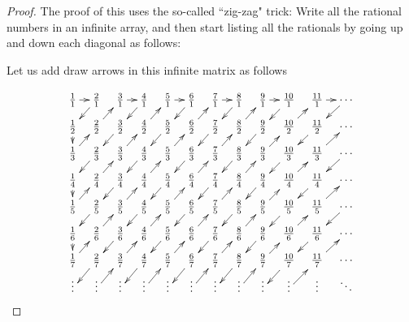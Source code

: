 \documentclass[a4paper,12pt,dvipsnames]{book}
\numberwithin{theorem}{chapter}
\theoremstyle{remark}
\begin{document}
\begin{proof}
The proof of this uses the so-called ``zig-zag" trick: Write all the rational numbers in an infinite array, and then start listing all the rationals by going up and down each diagonal as follows:


 Let us add draw arrows in this infinite matrix as
follows

$$\xymatrixrowsep{0.2cm}
\xymatrixcolsep{0.3cm}\xymatrix{
&\frac{1}{1}\ar@{->}[r] &\frac{2}{1}\ar@{->}[dl]&\frac{3}{1}\ar@{->}[r] &\frac{4}{1}\ar@{->}[dl]&\frac{5}{1}\ar@{->}[r] & \frac{6}{1}\ar@{->}[dl]& \frac{7}{1}\ar@{->}[r] & \frac{8}{1}\ar@{->}[dl]& \frac{9}{1}\ar@{->}[r] & \frac{10}{1}\ar@{->}[dl]& \frac{11}{1}\ar@{->}[r] &\cdots\ar@{->}[dl]&\\
&\frac{1}{2}\ar@{->}[d] &\frac{2}{2}\ar@{->}[ur]&\frac{3}{2}\ar@{->}[dl]&\frac{4}{2}\ar@{->}[ur]&\frac{5}{2}\ar@{->}[dl]& \frac{6}{2}\ar@{->}[ur]& \frac{7}{2}\ar@{->}[dl]& \frac{8}{2}\ar@{->}[ur]& \frac{9}{2}\ar@{->}[dl]& \frac{10}{2}\ar@{->}[ur]& \frac{11}{2}\ar@{->}[dl]&\cdots &\\
&\frac{1}{3}\ar@{->}[ur]&\frac{2}{3}\ar@{->}[dl]&\frac{3}{3}\ar@{->}[ur]&\frac{4}{3}\ar@{->}[dl]&\frac{5}{3}\ar@{->}[ur]& \frac{6}{3}\ar@{->}[dl]& \frac{7}{3}\ar@{->}[ur]& \frac{8}{3}\ar@{->}[dl]& \frac{9}{3}\ar@{->}[ur]& \frac{10}{3}\ar@{->}[dl]& \frac{11}{3}\ar@{->}[ur]&\cdots\ar@{->}[dl] &\\
&\frac{1}{4}\ar@{->}[d] &\frac{2}{4}\ar@{->}[ur]&\frac{3}{4}\ar@{->}[dl]&\frac{4}{4}\ar@{->}[ur]&\frac{5}{4}\ar@{->}[dl]& \frac{6}{4}\ar@{->}[ur]& \frac{7}{4}\ar@{->}[dl]& \frac{8}{4}\ar@{->}[ur]& \frac{9}{4}\ar@{->}[dl]& \frac{10}{4}\ar@{->}[ur]& \frac{11}{4}\ar@{->}[dl]&\cdots &\\
&\frac{1}{5}\ar@{->}[ur]&\frac{2}{5}\ar@{->}[dl]&\frac{3}{5}\ar@{->}[ur]&\frac{4}{5}\ar@{->}[dl]&\frac{5}{5}\ar@{->}[ur]& \frac{6}{5}\ar@{->}[dl]& \frac{7}{5}\ar@{->}[ur]& \frac{8}{5}\ar@{->}[dl]& \frac{9}{5}\ar@{->}[ur]& \frac{10}{5}\ar@{->}[dl]& \frac{11}{5}\ar@{->}[ur]&\cdots\ar@{->}[dl]&\\
&\frac{1}{6}\ar@{->}[d] &\frac{2}{6}\ar@{->}[ur]&\frac{3}{6}\ar@{->}[dl]&\frac{4}{6}\ar@{->}[ur]&\frac{5}{6}\ar@{->}[dl]& \frac{6}{6}\ar@{->}[ur]& \frac{7}{6}\ar@{->}[dl]& \frac{8}{6}\ar@{->}[ur]& \frac{9}{6}\ar@{->}[dl]& \frac{10}{6}\ar@{->}[ur]& \frac{11}{6}\ar@{->}[dl]&\cdots &\\
&\frac{1}{7}\ar@{->}[ur]&\frac{2}{7}\ar@{->}[dl]&\frac{3}{7}\ar@{->}[ur]&\frac{4}{7}\ar@{->}[dl]&\frac{5}{7}\ar@{->}[ur]& \frac{6}{7}\ar@{->}[dl]& \frac{7}{7}\ar@{->}[ur]& \frac{8}{7}\ar@{->}[dl]& \frac{9}{7}\ar@{->}[ur]& \frac{10}{7}\ar@{->}[dl]& \frac{11}{7}\ar@{->}[ur]&\cdots &\\
& \vdots                & \vdots\ar@{->}[ur]    &    \vdots             & \vdots \ar@{->}[ur]   &   \vdots              &   \vdots\ar@{->}[ur]   &   \vdots               &   \vdots\ar@{->}[ur]   &   \vdots               &   \vdots\ar@{->}[ur]    &   \vdots    & \ddots &}%
$$




\end{proof}
\end{document}
